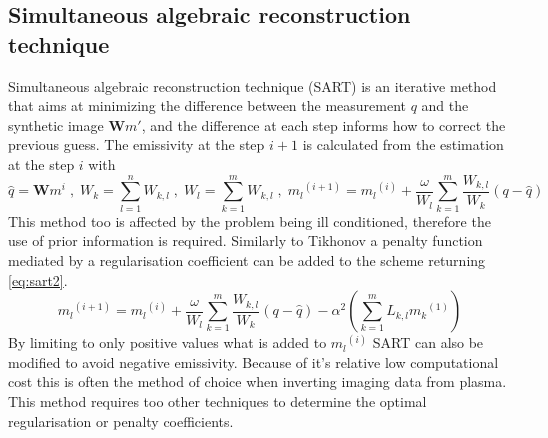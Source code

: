 \subsection{Simultaneous algebraic reconstruction technique}
Simultaneous algebraic reconstruction technique (SART) is an iterative method that aims at minimizing the difference between the measurement $q$ and the synthetic image $\bm{W}m'$, and the difference at each step informs how to correct the previous guess. The emissivity at the step $i+1$ is calculated from the estimation at the step $i$ with \cite{Carr2018,Andersen1984}
\begin{equation}
\hat{q} = \bm{W} m^i \; , \; W_{k} = {\sum_{l=1}^{n} W_{k,l}} \; , \; W_{l} = {\sum_{k=1}^{m} W_{k,l}}  \; , \; {m_{l}}^{(i+1)} = {m_{l}}^{(i)} + \frac{\omega}{W_{l}} {\sum_{k=1}^{m} \frac{W_{k,l}}{W_{k}}(q-\hat{q})}
\label{eq:sart1}
\end{equation}
This method too is affected by the problem being ill conditioned, therefore the use of prior information is required. Similarly to Tikhonov a penalty function mediated by a regularisation coefficient can be added to the scheme returning \autoref{eq:sart2}.
\begin{equation}
{m_{l}}^{(i+1)} = {m_{l}}^{(i)} + \frac{\omega}{W_{l}} {\sum_{k=1}^{m} \frac{W_{k,l}}{W_{k}}(q-\hat{q})} - \alpha^2({\sum_{k=1}^{m} L_{k,l} {m_{k}}^{(1)}})
\label{eq:sart2}
\end{equation}
By limiting to only positive values what is added to ${m_{l}}^{(i)}$ SART can also be modified to avoid negative emissivity.\cite{Carr2018} %
Because of it's relative low computational cost this is often the method of choice when inverting imaging data from plasma. This method requires too other techniques to determine the optimal regularisation or penalty coefficients.

